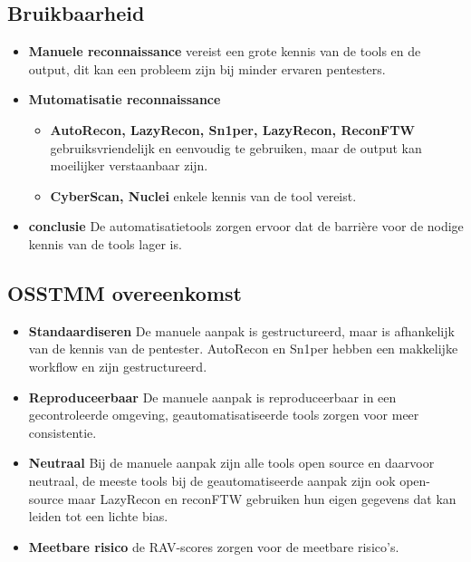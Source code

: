 \subsection{Bruikbaarheid}
\begin{itemize}
  \item \textbf{Manuele reconnaissance} vereist een grote kennis van de tools en de output, dit kan een probleem zijn bij minder ervaren pentesters.
  \item \textbf{Mutomatisatie reconnaissance} 
  \begin{itemize}
    \item \textbf{AutoRecon, LazyRecon, Sn1per, LazyRecon, ReconFTW} gebruiksvriendelijk en eenvoudig te gebruiken, maar de output kan moeilijker verstaanbaar zijn.
    \item \textbf{CyberScan, Nuclei} enkele kennis van de tool vereist.
  \end{itemize}
  \item \textbf{conclusie} De automatisatietools zorgen ervoor dat de barrière voor de nodige kennis van de tools lager is.
\end{itemize}


\subsection{OSSTMM overeenkomst}
\begin{itemize}
  \item \textbf{Standaardiseren} De manuele aanpak is gestructureerd, maar is afhankelijk van de kennis van de pentester. AutoRecon en Sn1per hebben een makkelijke workflow en zijn gestructureerd.
  \item \textbf{Reproduceerbaar} De manuele aanpak is reproduceerbaar in een gecontroleerde omgeving, geautomatisatiseerde tools zorgen voor meer consistentie.
  \item \textbf{Neutraal} Bij de manuele aanpak zijn alle tools open source en daarvoor neutraal, de meeste tools bij de geautomatiseerde aanpak zijn ook open-source maar LazyRecon en reconFTW gebruiken hun eigen gegevens dat kan leiden tot een lichte bias.
  \item \textbf{Meetbare risico} de RAV-scores zorgen voor de meetbare risico's.
\end{itemize}




